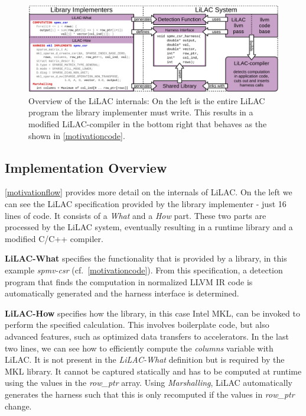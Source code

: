 \begin{figure}[t]
\includegraphics[width=\textwidth]{figures/whathowflow.pdf}
\caption{Overview of the LiLAC internals: On the left is the entire LiLAC
         program the library implementer must write. This results in a modified
         LiLAC-compiler in the bottom right that behaves as the shown in
         \autoref{motivationcode}.}
\label{motivationflow}
\end{figure}

\subsection{Implementation Overview}

\autoref{motivationflow} provides more detail on the internals of
LiLAC.  On the left we can see the LiLAC specification provided by the
library implementer - just 16 lines of code.  It consists of a
{\em What} and a {\em How} part.  These two parts are processed by the
LiLAC system, eventually resulting in a runtime library and a modified
C/C++ compiler.

{\bf LiLAC-What} specifies the functionality that is provided by a library,
in this example {\em spmv-csr} (cf.\ \autoref{motivationcode}).
From this specification, a detection program that finds the computation in
normalized LLVM IR code is automatically generated and the harness interface
is determined.

{\bf LiLAC-How} specifies how the library, in this case Intel MKL, can be
invoked to perform the specified calculation.
This involves boilerplate code, but also advanced features, such as optimized
data transfers to accelerators.
In the last two lines, we can see how to efficiently compute the {\em columns}
variable with LiLAC.
It is not present in the {\em LiLAC-What} definition but is required by the MKL library. It  cannot be
captured statically and has to be computed at runtime using the values in the
{\em row\_ptr} array.
Using {\em Marshalling}, LiLAC automatically generates the harness
such that this is only recomputed if the values in {\em row\_ptr} change.

